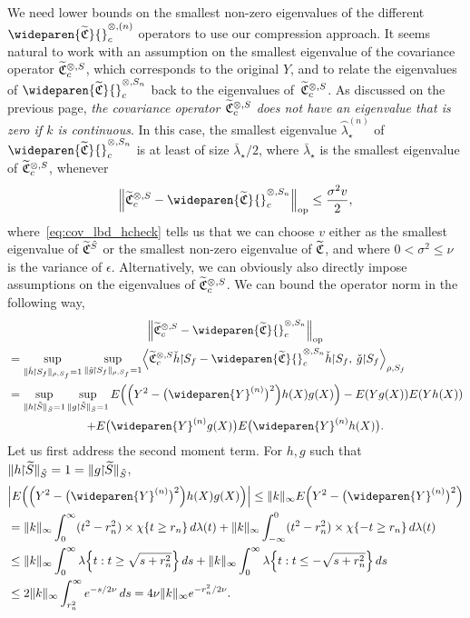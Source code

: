 \documentclass[10pt]{amsart}
\theoremstyle{definition}\newtheorem{defi}[theo]{Definition}\newtheorem{rema}[theo]{Remark}\newtheorem{exam}[theo]{Example}\newtheorem{exem}[theo]{Example}\newtheorem{nota}[theo]{Notation}
\theoremstyle{remark}
\DeclareMathOperator{\opp}{op}
\newcommand{\restrr}
{\!\!\upharpoonright\!\!}
\newcommand{\resttr}
{\!\upharpoonright\!}
\newcommand{\fkC}{\mathfrak{C}}
\newcommand{\Cov}{\tilde{\fkC}}
\newcommand{\CovCap}{\wideparen{\widetilde{\fkC}}{\vphantom{\fkC}}^{\otimes,(n)}_c}
\newcommand{\CovCapn}{\wideparen{\widetilde{\fkC}}{\vphantom{\fkC}}^{\otimes,S_n}_c}
\newcommand*{\mk}{\mkern -1mu}
\let\oldtilde\tilde
\renewcommand*{\tilde}[1]{\mathchoice{\widetilde{#1}}{\widetilde{#1}}{\oldtilde{#1}}{\oldtilde{#1}}}
\let\originalleft\left
\let\originalright\right
\renewcommand{\left}{\mathopen{}\mathclose\bgroup\originalleft}
\renewcommand{\right}{\aftergroup\egroup\originalright}
\begin{document}
We need lower bounds on the smallest non-zero eigenvalues of the different $\CovCap$ operators to use our compression approach. It seems natural to work with an assumption on the smallest eigenvalue of the covariance operator $\tilde{\fkC}^{\otimes,S}_c$, which corresponds to the original $Y$, and to relate the eigenvalues of $\CovCapn$ back to the eigenvalues of~$\tilde{\fkC}^{\otimes,S}_c$. As discussed on the previous page, \emph{the covariance operator $\tilde{\fkC}^{\otimes,S}_c$ does not have an eigenvalue that is zero if $k$ is continuous}. In this case, the smallest eigenvalue $\wideparen{\lambda}^{(n)}_\star$ of $\CovCapn$ is at least of size $\bar \lambda_\star/2$, where $\bar \lambda_\star$ is the smallest eigenvalue of $\tilde{\fkC}^{\otimes,S}_c$, whenever
\[
\left\| \tilde{\fkC}^{\otimes,S}_c - \CovCapn\right\|_{\opp} \leq \frac{\sigma^2 v}{2},
\]
where~\eqref{eq:cov_lbd_hcheck} tells us that we can choose $v$ either as the smallest eigenvalue of $\Cov^{\tilde S}$ or the smallest non-zero eigenvalue of $\Cov$, and where $0< \sigma^2 \leq \nu$ is the variance of $\epsilon$. Alternatively, we can obviously also directly impose assumptions on the eigenvalues of $\tilde{\fkC}^{\otimes,S}_c$. We can bound the operator norm in the following way,
\begin{multline*}
\left\| \tilde{\fkC}^{\otimes,S}_c - \CovCapn \right\|_{\opp} \\
\begin{aligned}
&=
\sup_{\| \check h \mk\upharpoonright\mk S_f\|_{\rho,S_f} =1} \sup_{\| \check g \mk\upharpoonright\mk S_f\|_{\rho,S_f} =1%
}
\left\langle \Cov^{\otimes,S}_c \check h \restrr S_f- \CovCapn \check h \restrr S_f,\: \check g \restrr S_f \right\rangle_{\rho,S_f} \\
&= \sup_{\| h \mk\upharpoonright\mk \tilde S\|_{\tilde S} = 1} \sup_{\| g \mk\upharpoonright\mk \tilde S\|_{\tilde S} = 1} E\left(\left(Y^2 - \bigl(\wideparen{Y}^{(n)}\bigr)^2\right) h(X)g(X)\right)- E(Y g(X)) E(Y h(X)) \\
\end{aligned}\\
+ E\bigl(\wideparen{Y}^{(n)} g(X)\bigr) E\bigl(\wideparen{Y}^{(n)} h(X)\bigr).
\end{multline*}
Let us first address the second moment term. For $h,g$ such that $\| h \restrr \tilde S\|_{\tilde S} = 1 = \| g \restrr \tilde S\|_{\tilde S} $,
\begin{align*}
&\left|E\left(\left(Y^2 - \bigl(\wideparen{Y}^{(n)}\bigr)^2\right) h(X)g(X)\right)\right| \leq \|k\|_\infty E\left(Y^2 - \bigl(\wideparen{Y}^{(n)}\bigr)^2\right) \\
&= \|k\|_\infty \int_0^\infty (t^2 - r_n^2) \times \chi\{t \geq r_n \} \,d \lambda(t) + \|k\|_\infty \int_{-\infty}^0 (t^2 - r_n^2) \times \chi \{ -t \geq r_n\} \, d\lambda(t) \\
&\leq \|k\|_\infty \int_{0}^\infty \lambda\left\{t: t \geq \sqrt{s + r_n^2}\right\} \,ds + \|k\|_\infty \int_0^\infty \lambda\left\{t: t\leq - \sqrt{s + r_n^2} \right\} \, ds \\
&\leq 2 \|k\|_\infty \int_{r_n^2}^\infty e^{-s /2 \nu} \, ds = 4\nu \|k\|_\infty e^{-r^2_n/2 \nu}.
\end{align*}
\end{document}
